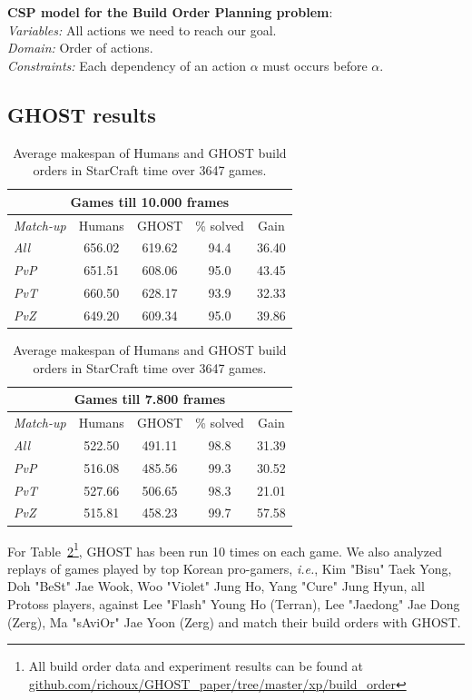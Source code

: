 \documentclass[journal]{IEEEtran}
\newcommand{\ghost}{\textsc{GHOST}\xspace}
\newcommand{\ie}{\textit{i.e.}}
\newcommand{\modelcsp}[4]%
{ \begin{trivlist}
  \item[]%
    \textbf{CSP model for #1}:\\
    \textit{Variables:} #2\\
    \textit{Domain:} #3\\
    \textit{Constraints:} #4
  \end{trivlist}%
}
\begin{document}
\modelcsp{the Build Order Planning problem}%
{All actions we need to reach our goal.}%
{Order of actions.}%
{Each dependency of an action $\alpha$ must occurs before $\alpha$.}

\subsection{\ghost results}

\begin{table}[h!]
  \centering
  \caption{Average  makespan  of Humans  and  \ghost  build orders  in
    StarCraft time over 3647 games.}
  \label{tab:bo}
  \begin{tabular}{|l|c|c|c|c|} 
    \hline
    \multicolumn{5}{|c|}{Games till 10.000 frames} \\ 
    \hline
    {\em Match-up} & Humans & \ghost & \% solved &
    Gain \\ 
    \hline
    {\em All} & 656.02 & 619.62 & 94.4 & 36.40\\
    {\em PvP} & 651.51 & 608.06 & 95.0 & 43.45\\
    {\em PvT} & 660.50 & 628.17 & 93.9 & 32.33\\
    {\em PvZ} & 649.20 & 609.34 & 95.0 & 39.86\\
    \hline
  \end{tabular}
  \begin{tabular}{|l|c|c|c|c|} 
    \hline
    \multicolumn{5}{|c|}{Games till 7.800 frames} \\ 
    \hline
    {\em Match-up} & Humans & \ghost & \% solved &
    Gain \\ 
    \hline
    {\em All} & 522.50 & 491.11 & 98.8 & 31.39\\
    {\em PvP} & 516.08 & 485.56 & 99.3 & 30.52\\
    {\em PvT} & 527.66 & 506.65 & 98.3 & 21.01\\
    {\em PvZ} & 515.81 & 458.23 & 99.7 & 57.58\\ 
    \hline
  \end{tabular}  
\end{table}

For  Table~\ref{tab:bo}\footnote{All build  order data  and experiment
  results            can             be            found            at
  \href{https://github.com/richoux/GHOST\_paper/tree/master/xp/build\_order}{github.com/richoux/GHOST\_paper/tree/master/xp/build\_order}},
\ghost has been run 10 times on each game. We also analyzed replays of
games played by top Korean pro-gamers,  \ie, Kim "Bisu" Taek Yong, Doh
"BeSt" Jae  Wook, Woo  "Violet" Jung  Ho, Yang  "Cure" Jung  Hyun, all
Protoss players, against Lee "Flash"  Young Ho (Terran), Lee "Jaedong"
Jae Dong  (Zerg), Ma "sAviOr"  Jae Yoon  (Zerg) and match  their build
orders with \ghost {}.
\end{document}
